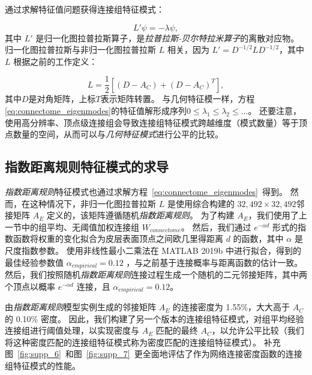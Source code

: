 \documentclass[lang=cn,a4paper,newtx,citestyle=gb7714-2015, bibstyle=gb7714-2015]{elegantpaper}
\begin{document}
通过求解特征值问题获得连接组特征模式：


\begin{equation}\label{eq:connectome_eigenmodes}
	L' \psi = - \lambda \psi,
\end{equation}
其中 $ L' $ 是归一化图拉普拉斯算子，是\textit{拉普拉斯-贝尔特拉米算子}的离散对应物。
归一化图拉普拉斯与非归一化图拉普拉斯 $ L $ 相关，因为 $ L' = D^{-1/2} L D^{-1/2} $，其中 $ L $ 根据之前的工作\cite{levy2006laplace}定义：

\begin{equation}\label{eq:unnormalized_Laplacian}
	L = \frac{1}{2} [ (D-A_C) + (D-A_C)^T ],
\end{equation}
其中$ D $是对角矩阵，上标$ T $表示矩阵转置。
与几何特征模一样，方程\ref{eq:connectome_eigenmodes}的特征值解形成序列$ 0 \leq \lambda_1 \leq \lambda_2 \leq ... $。
还要注意，使用高分辨率、顶点级连接组会导致连接组特征模式跨越维度（模式数量）等于顶点数量的空间，从而可以与\textit{几何特征模式}进行公平的比较。



\subsection{指数距离规则特征模式的求导} \label{sec:EDR_derivation}

\textit{指数距离规则}特征模式也通过求解方程~\ref{eq:connectome_eigenmodes}~得到。
然而，在这种情况下，非归一化图拉普拉斯 $ L $ 是使用综合构建的 $ 32,492 \times 32,492  $邻接矩阵 $ A_E $ 定义的，该矩阵遵循随机\textit{指数距离规则}。
为了构建 $ A_E $，我们使用了上一节中的组平均、无阈值加权连接组 $ W_{connectome} $。
然后，我们通过 $ e^{-\alpha d} $ 形式的指数函数将权重的变化拟合为皮层表面顶点之间欧几里得距离 $ d $ 的函数，其中 $ \alpha $ 是尺度指数参数。
使用非线性最小二乘法在 MATLAB 2019b 中进行拟合，得到的最佳经验参数值 $ \alpha_{empirical} = 0.12 $ ，与之前基于连接概率与距离函数的估计一致\cite{theodoni2022structural}。
然后，我们按照随机\textit{指数距离规则}连接过程生成一个随机的二元邻接矩阵，其中两个顶点以概率 $ e^{-\alpha d} $ 连接，且 $ \alpha_{empirical} = 0.12 $。


由\textit{指数距离规则}模型实例生成的邻接矩阵 $ A_E $ 的连接密度为 1.55\%，大大高于 $ A_C $ 的 0.10\% 密度。
因此，我们构建了另一个版本的连接组特征模式，对组平均经验连接组进行阈值处理，以实现密度与 $ A_E $ 匹配的最终 $ A_C $，以允许公平比较（我们将这种密度匹配的连接组特征模式称为密度匹配的连接组特征模式）。
补充图~\ref{fig:supp_6}~和图~\ref{fig:supp_7}~更全面地评估了作为网络连接密度函数的连接组特征模式的性能。
\end{document}
